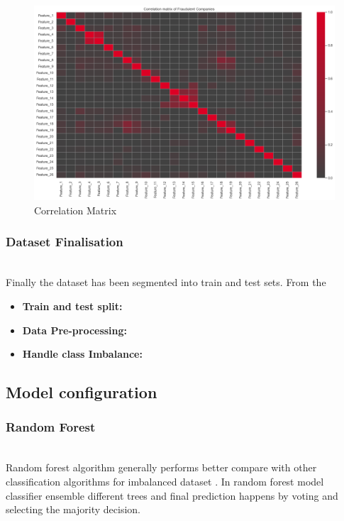 \begin{figure}[H]
    \centering
    \includegraphics[width=\linewidth]{figures/corr.png}
    \caption{Correlation Matrix}
    \label{fig:corr}
\end{figure}

\subsubsection{Dataset Finalisation}\hspace*{\fill} \\
Finally the dataset has been segmented into train and test sets. From the
\begin{itemize}
    \item \textbf{Train and test split:}
    \item \textbf{Data Pre-processing:}
    \item \textbf{Handle class Imbalance:}
\end{itemize}

\subsection{Model configuration}

\subsubsection{Random Forest}\hspace*{\fill} \\
Random forest algorithm generally performs better compare with other classification algorithms for imbalanced dataset \cite{Valecha2018PredictionOC}. In random forest model classifier ensemble different trees and final prediction happens by voting and selecting the majority decision. 

